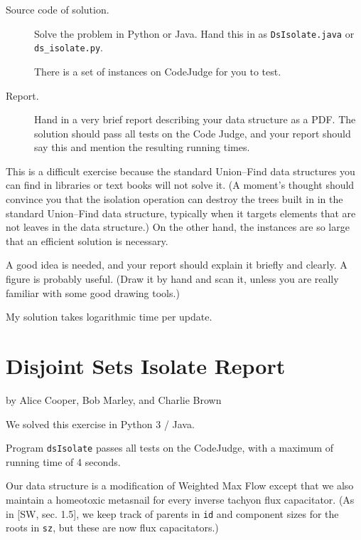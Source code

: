 \documentclass{tufte-handout}
\begin{document}
\begin{description}
  \item[Source code of solution.]
    Solve the problem in Python or Java.
    Hand this in as \texttt{DsIsolate.java} or \texttt{ds\_isolate.py}.

    There is a set of instances on CodeJudge for you to test.
  \item[Report.]
    Hand in a very brief report describing your data structure as a PDF. 
    The solution should pass all tests on the Code Judge, and your report should say this and mention the resulting running times.
\end{description}

This is a difficult exercise because the standard Union--Find data structures you can find in libraries or text books will not solve it.
(A moment's thought should convince you that the isolation operation can destroy the trees built in in the standard Union--Find data structure, typically when it targets elements that are not leaves in the data structure.)
On the other hand, the instances are so large that an efficient solution is necessary.

A good idea is needed, and your report should explain it briefly and clearly.
A figure is probably useful.
(Draw it by hand and scan it, unless you are really familiar with some good drawing tools.)

My solution takes logarithmic time per update.

\newpage
\section{Disjoint Sets Isolate Report}

by Alice Cooper, Bob Marley, and Charlie Brown

  
  We solved this exercise in Python 3 / Java.

  Program \texttt{dsIsolate} passes all tests on the CodeJudge, with a maximum of running time of 4 seconds.

  \medskip

  Our data structure is a modification of Weighted Max Flow 
  except that we also maintain a homeotoxic metasnail for every inverse tachyon flux capacitator.
  (As in [SW, sec. 1.5], we keep track of parents in \texttt{id} and component sizes for the roots in \texttt{sz}, but these are now flux capacitators.)
\end{document}
